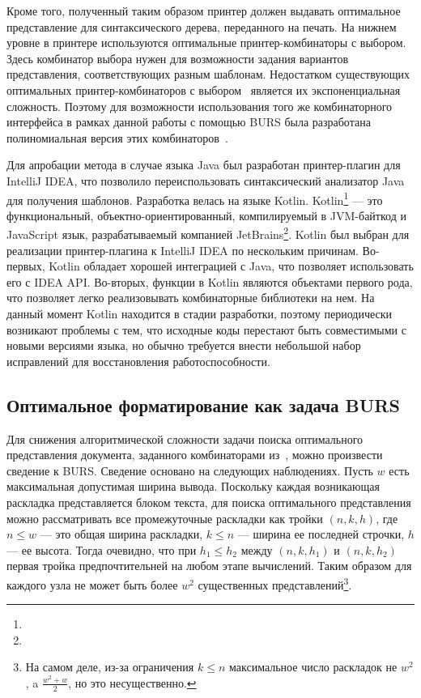 Кроме того, полученный таким образом принтер должен выдавать оптимальное представление
для синтаксического дерева, переданного на печать. На нижнем уровне в принтере 
используются оптимальные принтер-комбинаторы с выбором. Здесь комбинатор выбора нужен
для возможности задания вариантов представления, соответствующих разным шаблонам.
Недостатком существующих оптимальных принтер-комбинаторов с выбором~\cite{swierstra}
является их экспоненциальная сложность. Поэтому для возможности использования того же
комбинаторного интерфейса в рамках данной работы с помощью BURS была разработана
полиномиальная версия этих комбинаторов~\cite{podkopaevBoulytchev}.

Для апробации метода в случае языка Java был разработан принтер-плагин для
IntelliJ IDEA, что позволило переиспользовать синтаксический анализатор Java
для получения шаблонов.
Разработка велась на языке Kotlin.
Kotlin\footnote{}
--- это функциональный, объектно-ориентированный, компилируемый
в JVM-байткод и JavaScript язык, разрабатываемый компанией
JetBrains\footnote{}.
Kotlin был выбран для реализации принтер-плагина к IntelliJ IDEA по нескольким
причинам. 
Во-первых, Kotlin обладает хорошей интеграцией с Java, что позволяет
использовать его с IDEA API. 
Во-вторых, функции в Kotlin являются объектами первого рода, что позволяет
легко реализовывать комбинаторные библиотеки на нем.
На данный момент Kotlin находится в стадии разработки, поэтому
периодически возникают
проблемы с тем, что исходные коды перестают быть совместимыми с новыми
версиями языка,
но обычно требуется внести небольшой набор исправлений для
восстановления работоспособности.


\subsection{Оптимальное форматирование как задача BURS}

Для снижения алгоритмической сложности задачи поиска
оптимального представления документа, заданного комбинаторами из~\cite{swierstra},
можно произвести сведение к BURS.
Сведение основано на следующих наблюдениях.
Пусть $w$ есть максимальная допустимая
ширина вывода. Поскольку каждая возникающая раскладка представляется блоком
текста, для поиска оптимального представления можно рассматривать
все промежуточные раскладки
как тройки $(n, k, h)$, где $n \le w$ --- это общая ширина раскладки, $k \le n$ ---
ширина ее последней строчки, $h$ --- ее высота. Тогда очевидно, что при $h_1 \le h_2$
между $(n, k, h_1)$ и $(n, k, h_2)$ первая тройка предпочтительней на любом этапе вычислений.
Таким образом для каждого узла не может быть более $w^2$ существенных представлений\footnote{
На самом деле, из-за ограничения $k \le n$ максимальное число раскладок не $w^2$, a
$\frac{w^2 + w}{2}$, но это несущественно.}.

